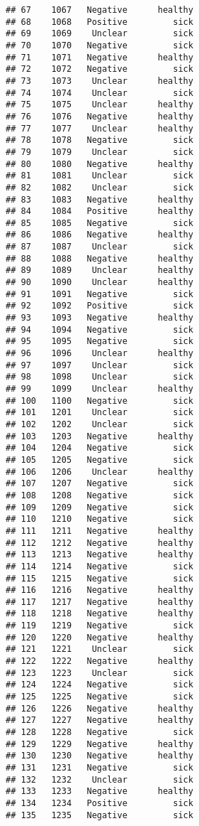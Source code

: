 \documentclass[
]{article}
\begin{document}
\begin{verbatim}
## 67    1067   Negative      healthy
## 68    1068   Positive         sick
## 69    1069    Unclear         sick
## 70    1070   Negative         sick
## 71    1071   Negative      healthy
## 72    1072   Negative         sick
## 73    1073    Unclear      healthy
## 74    1074    Unclear         sick
## 75    1075    Unclear      healthy
## 76    1076   Negative      healthy
## 77    1077    Unclear      healthy
## 78    1078   Negative         sick
## 79    1079    Unclear         sick
## 80    1080   Negative      healthy
## 81    1081    Unclear         sick
## 82    1082    Unclear         sick
## 83    1083   Negative      healthy
## 84    1084   Positive      healthy
## 85    1085   Negative         sick
## 86    1086   Negative      healthy
## 87    1087    Unclear         sick
## 88    1088   Negative      healthy
## 89    1089    Unclear      healthy
## 90    1090    Unclear      healthy
## 91    1091   Negative         sick
## 92    1092   Positive         sick
## 93    1093   Negative      healthy
## 94    1094   Negative         sick
## 95    1095   Negative         sick
## 96    1096    Unclear      healthy
## 97    1097    Unclear         sick
## 98    1098    Unclear         sick
## 99    1099    Unclear      healthy
## 100   1100   Negative         sick
## 101   1201    Unclear         sick
## 102   1202    Unclear         sick
## 103   1203   Negative      healthy
## 104   1204   Negative         sick
## 105   1205   Negative         sick
## 106   1206    Unclear      healthy
## 107   1207   Negative         sick
## 108   1208   Negative         sick
## 109   1209   Negative         sick
## 110   1210   Negative         sick
## 111   1211   Negative      healthy
## 112   1212   Negative      healthy
## 113   1213   Negative      healthy
## 114   1214   Negative         sick
## 115   1215   Negative         sick
## 116   1216   Negative      healthy
## 117   1217   Negative      healthy
## 118   1218   Negative      healthy
## 119   1219   Negative         sick
## 120   1220   Negative      healthy
## 121   1221    Unclear         sick
## 122   1222   Negative      healthy
## 123   1223    Unclear         sick
## 124   1224   Negative         sick
## 125   1225   Negative         sick
## 126   1226   Negative      healthy
## 127   1227   Negative      healthy
## 128   1228   Negative         sick
## 129   1229   Negative      healthy
## 130   1230   Negative      healthy
## 131   1231   Negative         sick
## 132   1232    Unclear         sick
## 133   1233   Negative      healthy
## 134   1234   Positive         sick
## 135   1235   Negative         sick

\end{verbatim}
\end{document}
